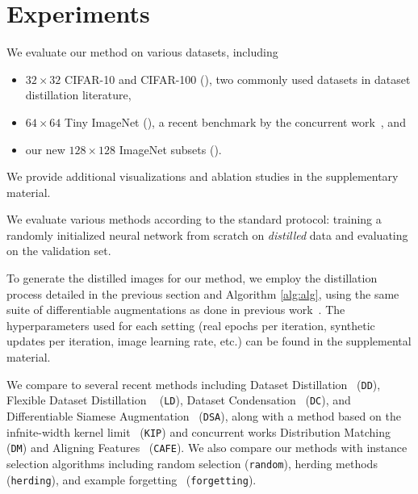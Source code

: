 
\section{Experiments}
We evaluate our method on various datasets, including \begin{itemize}[topsep=1pt, partopsep=9pt, itemsep=-1pt, parsep=0.5ex]
    \item $32\times32$ CIFAR-10 and CIFAR-100 (), two commonly used datasets in dataset distillation literature,
    \item $64\times 64$ Tiny ImageNet (), a recent benchmark by the concurrent work~\cite{dm}, and 
    \item our new $128 \times 128$ ImageNet subsets ().
\end{itemize}
We provide additional visualizations and ablation studies in the supplementary material. 


We evaluate various methods according to the standard protocol: training a randomly initialized neural network from scratch on \emph{distilled} data and evaluating on the validation set. %

To generate the distilled images for our method, we employ the distillation process detailed in the previous section and Algorithm \ref{alg:alg}, using the same suite of differentiable augmentations as done in previous work~\cite{dsa,dm}. The hyperparameters used for each setting (real epochs per iteration, synthetic updates per iteration, image learning rate, etc.) can be found in the supplemental material. 





We compare to several recent methods including Dataset Distillation~\cite{dd} (\texttt{DD}), Flexible Dataset Distillation ~\cite{bohdal2020flexible} (\texttt{LD}), Dataset Condensation~\cite{dc} (\texttt{DC}), and Differentiable Siamese Augmentation~\cite{dsa} (\texttt{DSA}), along with a method based on the infnite-width kernel limit~\citep{nguyen2020dataset,nguyen2021dataset} (\texttt{KIP}) and concurrent works Distribution Matching~\cite{dm} (\texttt{DM}) and Aligning Features~\cite{wang2022cafe} (\texttt{CAFE}). We also compare our methods with instance selection algorithms including random selection (\texttt{random}), herding methods~\cite{chen2010super} (\texttt{herding}), and example forgetting~\cite{toneva2018empirical} (\texttt{forgetting}). 

